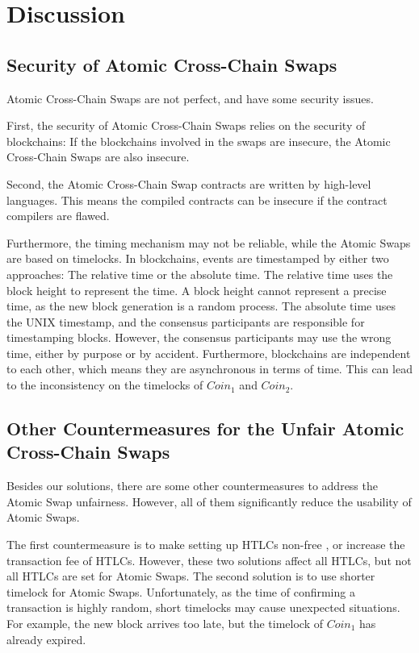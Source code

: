 \section{Discussion}
\label{sec:discussion}


\subsection{Security of Atomic Cross-Chain Swaps}

Atomic Cross-Chain Swaps are not perfect, and have some security issues.

First, the security of Atomic Cross-Chain Swaps relies on the security of blockchains:
If the blockchains involved in the swaps are insecure, the Atomic Cross-Chain Swaps are also insecure.

Second, the Atomic Cross-Chain Swap contracts are written by high-level languages.
This means the compiled contracts can be insecure if the contract compilers are flawed.

Furthermore, the timing mechanism may not be reliable, while the Atomic Swaps are based on timelocks.
In blockchains, events are timestamped by either two approaches: The relative time or the absolute time.
The relative time uses the block height to represent the time.
A block height cannot represent a precise time, as the new block generation is a random process.
The absolute time uses the UNIX timestamp, and the consensus participants are responsible for timestamping blocks.
However, the consensus participants may use the wrong time, either by purpose or by accident.
Furthermore, blockchains are independent to each other, which means they are asynchronous in terms of time.
This can lead to the inconsistency on the timelocks of $Coin_1$ and $Coin_2$.


\subsection{Other Countermeasures for the Unfair Atomic Cross-Chain Swaps}

Besides our solutions, there are some other countermeasures to address the Atomic Swap unfairness.
However, all of them significantly reduce the usability of Atomic Swaps.

The first countermeasure is to make setting up HTLCs non-free , or increase the transaction fee of HTLCs.
However, these two solutions affect all HTLCs, but not all HTLCs are set for Atomic Swaps.
The second solution is to use shorter timelock for Atomic Swaps.
Unfortunately, as the time of confirming a transaction is highly random,
short timelocks may cause unexpected situations.
For example, the new block arrives too late, but the timelock of $Coin_1$ has already expired.

